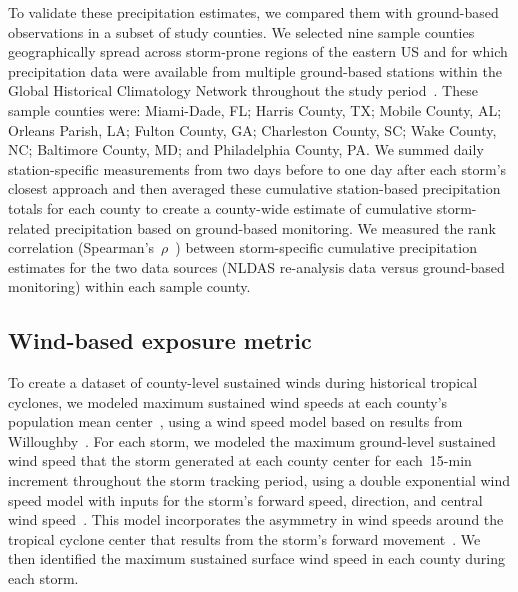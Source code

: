 To validate these precipitation estimates, we compared them with ground-based
observations in a subset of study counties. We selected nine sample counties
geographically spread across storm-prone regions of the eastern \ac{US} and for
which precipitation data were available from multiple ground-based stations
within the Global Historical Climatology Network throughout the study
period~\parencite{menne2012overview, rnoaa, countyweather}. These sample
counties were: Miami-Dade, FL; Harris County, TX; Mobile County, AL; Orleans
Parish, LA; Fulton County, GA; Charleston County, SC; Wake County, NC;
Baltimore County, MD; and Philadelphia County, PA. We summed daily
station-specific measurements from two days before to one day after each
storm's closest approach and then averaged these cumulative station-based
precipitation totals for each county to create a county-wide estimate of
cumulative storm-related precipitation based on ground-based monitoring. We
measured the rank correlation (Spearman's~$\rho$~\parencite{spearman1904proof})
between storm-specific cumulative precipitation estimates for the two data
sources (\ac{NLDAS} re-analysis data versus ground-based monitoring) within
each sample county.

\subsection*{Wind-based exposure metric}

To create a dataset of county-level sustained winds during historical tropical
cyclones, we modeled maximum sustained wind speeds at each county's population
mean center~\parencite{countycenters}, using a wind speed model based on
results from Willoughby~\parencite{willoughby2006parametric}. For each storm,
we modeled the maximum ground-level sustained wind speed that the storm
generated at each county center for each~15-\si{\minute} increment throughout
the storm tracking period, using a double exponential wind speed model with
inputs for the storm's forward speed, direction, and central wind
speed~\parencite{willoughby2006parametric, stormwindmodel}. This model
incorporates the asymmetry in wind speeds around the tropical cyclone center
that results from the storm's forward movement~\parencite{phadke2003modeling,
stormwindmodel}. We then identified the maximum sustained surface wind speed in
each county during each storm.

